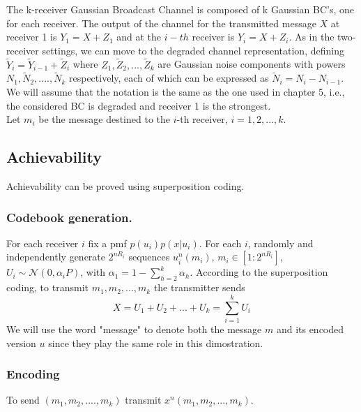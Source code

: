 \renewcommand{\arraystretch}{2}
The k-receiver Gaussian Broadcast Channel is composed of k Gaussian BC's, one for each receiver. The output of the channel for the transmitted message $X$ at receiver 1 is $Y_1 = X+Z_1$ and at the $i-th$ receiver is $Y_i = X+Z_i$. As in the two-receiver settings, we can move to the degraded channel representation, defining $\tilde{Y}_i = \tilde{Y}_{i-1}+\tilde{Z}_i$ where $Z_1,\tilde{Z}_2,...,\tilde{Z}_k$ are Gaussian noise components with powers $N_1,\tilde{N}_2,....,\tilde{N}_k$ respectively, each of which can be expressed as $\tilde{N}_i = N_i-N_{i-1}$. We will assume that the notation is the same as the one used in chapter 5, i.e., the considered BC is degraded and receiver 1 is the strongest. \\
Let $m_i$ be the message destined to the $i$-th receiver, $i=1,2,...,k$.
\subsection{Achievability}
Achievability can be proved using superposition coding.
\subsubsection*{Codebook generation.}
 For each receiver $i$ fix a pmf $p(u_i)p(x|u_i)$. For each $i$, randomly and independently generate $2^{nR_i}$ sequences $u^n_i(m_i)$, $m_i\in [1:2^{nR_i}]$, $U_i\sim \mathcal{N}(0, \alpha_i P)$, with $\alpha_1 = 1-\sum_{h=2}^k \alpha_h$.
According to the superposition coding, to transmit $m_1,m_2,...,m_k$ the transmitter sends
\begin{equation}
X = U_1+ U_2+...+U_k = \sum_{i=1}^k U_i
\end{equation}
We will use the word "message" to denote both the message $m$ and its encoded version $u$ since they play the same role in this dimostration.
\subsubsection*{Encoding}
To send $(m_1,m_2,....,m_k)$ transmit $x^n(m_1,m_2, ...,m_k)$.
